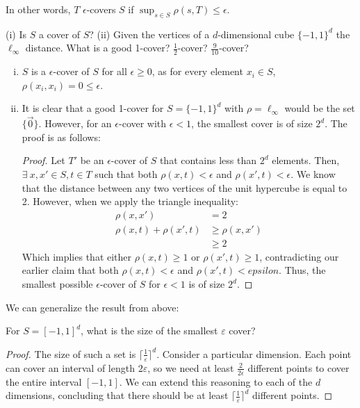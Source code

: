 In other words, $T$ $\epsilon$-covers $S$ if $\sup_{s\in S} 
\rho(s,T)\leq \epsilon$.

\begin{exercise}
(i) Is $S$ a cover of $S$? (ii) Given the vertices of a $d$-dimensional
cube $\{-1,1\}^d$ the $\ell_\infty$ distance. What is a good 1-cover?
$\frac{1}{2}$-cover? $\frac{9}{10}$-cover?
\end{exercise}

\begin{enumerate}[(i)]
	\item $S$ is a $\epsilon$-cover of $S$ for all $\epsilon \geq 0$,
	as for every element $x_i \in S$, $\rho(x_i, x_i) = 0 \leq 
	\epsilon$.
	
	\item It is clear that a good 1-cover for $S = \{-1, 1\}^d$ with 
	$\rho = \ell_\infty$ would be the set $\{\vec{0}\}$. However, for 
	an $\epsilon$-cover with $\epsilon < 1$, the smallest cover is of 
	size $2^d$. The proof is as follows:
	
	\begin{proof}
		Let $T'$ be an $\epsilon$-cover of $S$ that contains less than
		$2^d$ elements. Then, $\exists\ x, x' \in S, t \in T$ such that 
		both $\rho(x, t) < \epsilon$ and $\rho(x', t) < \epsilon$. We 
		know that the distance between any two vertices of the unit 
		hypercube is equal to 2. However, when we apply the triangle
		inequality:
		\begin{align*}
			\rho(x, x') & = 2\\
			\rho(x, t) + \rho(x', t) & \geq \rho(x, x')\\
			& \geq 2
		\end{align*}
		Which implies that either $\rho(x, t) \geq 1$ or $\rho(x', t) 
		\geq 1$, contradicting our earlier claim that both $\rho(x, t) 
		< \epsilon$ and $\rho(x', t) < epsilon$. Thus, the smallest
		possible $\epsilon$-cover of $S$ for $\epsilon < 1$ is of size
		$2^d$.
	\end{proof}
\end{enumerate}

We can generalize the result from above:
\begin{exercise}
For $S = [-1,1]^d$, what is the size of the smallest $\varepsilon$ cover?
\end{exercise}
\begin{proof}
    The size of such a set is $\lceil\frac{1}{\varepsilon}\rceil^d$.
    Consider a particular dimension. Each point can cover an interval
    of length $2\varepsilon$, so we need at least
    $\frac{2}{2\epsilon}$ different points to cover the entire
    interval $[-1, 1]$. We can extend this reasoning to each of the
    $d$ dimensions, concluding that there should be at least 
    $\lceil\frac{1}{\varepsilon}\rceil^d$ different points.
\end{proof}
